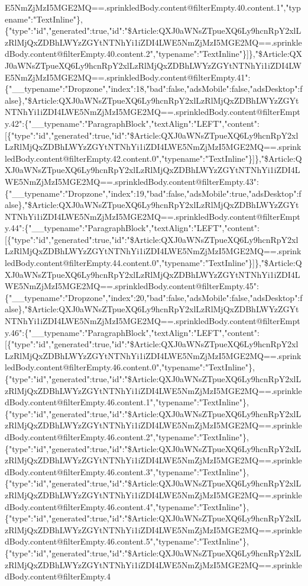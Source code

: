 E5NmZjMzI5MGE2MQ==.sprinkledBody.content@filterEmpty.40.content.1","typename":"TextInline"\},\{"type":"id","generated":true,"id":"\$Article:QXJ0aWNsZTpueXQ6Ly9hcnRpY2xlLzRlMjQxZDBhLWYzZGYtNTNhYi1iZDI4LWE5NmZjMzI5MGE2MQ==.sprinkledBody.content@filterEmpty.40.content.2","typename":"TextInline"\}{]}\},"\$Article:QXJ0aWNsZTpueXQ6Ly9hcnRpY2xlLzRlMjQxZDBhLWYzZGYtNTNhYi1iZDI4LWE5NmZjMzI5MGE2MQ==.sprinkledBody.content@filterEmpty.41":\{"\_\_typename":"Dropzone","index":18,"bad":false,"adsMobile":false,"adsDesktop":false\},"\$Article:QXJ0aWNsZTpueXQ6Ly9hcnRpY2xlLzRlMjQxZDBhLWYzZGYtNTNhYi1iZDI4LWE5NmZjMzI5MGE2MQ==.sprinkledBody.content@filterEmpty.42":\{"\_\_typename":"ParagraphBlock","textAlign":"LEFT","content":{[}\{"type":"id","generated":true,"id":"\$Article:QXJ0aWNsZTpueXQ6Ly9hcnRpY2xlLzRlMjQxZDBhLWYzZGYtNTNhYi1iZDI4LWE5NmZjMzI5MGE2MQ==.sprinkledBody.content@filterEmpty.42.content.0","typename":"TextInline"\}{]}\},"\$Article:QXJ0aWNsZTpueXQ6Ly9hcnRpY2xlLzRlMjQxZDBhLWYzZGYtNTNhYi1iZDI4LWE5NmZjMzI5MGE2MQ==.sprinkledBody.content@filterEmpty.43":\{"\_\_typename":"Dropzone","index":19,"bad":false,"adsMobile":true,"adsDesktop":false\},"\$Article:QXJ0aWNsZTpueXQ6Ly9hcnRpY2xlLzRlMjQxZDBhLWYzZGYtNTNhYi1iZDI4LWE5NmZjMzI5MGE2MQ==.sprinkledBody.content@filterEmpty.44":\{"\_\_typename":"ParagraphBlock","textAlign":"LEFT","content":{[}\{"type":"id","generated":true,"id":"\$Article:QXJ0aWNsZTpueXQ6Ly9hcnRpY2xlLzRlMjQxZDBhLWYzZGYtNTNhYi1iZDI4LWE5NmZjMzI5MGE2MQ==.sprinkledBody.content@filterEmpty.44.content.0","typename":"TextInline"\}{]}\},"\$Article:QXJ0aWNsZTpueXQ6Ly9hcnRpY2xlLzRlMjQxZDBhLWYzZGYtNTNhYi1iZDI4LWE5NmZjMzI5MGE2MQ==.sprinkledBody.content@filterEmpty.45":\{"\_\_typename":"Dropzone","index":20,"bad":false,"adsMobile":false,"adsDesktop":false\},"\$Article:QXJ0aWNsZTpueXQ6Ly9hcnRpY2xlLzRlMjQxZDBhLWYzZGYtNTNhYi1iZDI4LWE5NmZjMzI5MGE2MQ==.sprinkledBody.content@filterEmpty.46":\{"\_\_typename":"ParagraphBlock","textAlign":"LEFT","content":{[}\{"type":"id","generated":true,"id":"\$Article:QXJ0aWNsZTpueXQ6Ly9hcnRpY2xlLzRlMjQxZDBhLWYzZGYtNTNhYi1iZDI4LWE5NmZjMzI5MGE2MQ==.sprinkledBody.content@filterEmpty.46.content.0","typename":"TextInline"\},\{"type":"id","generated":true,"id":"\$Article:QXJ0aWNsZTpueXQ6Ly9hcnRpY2xlLzRlMjQxZDBhLWYzZGYtNTNhYi1iZDI4LWE5NmZjMzI5MGE2MQ==.sprinkledBody.content@filterEmpty.46.content.1","typename":"TextInline"\},\{"type":"id","generated":true,"id":"\$Article:QXJ0aWNsZTpueXQ6Ly9hcnRpY2xlLzRlMjQxZDBhLWYzZGYtNTNhYi1iZDI4LWE5NmZjMzI5MGE2MQ==.sprinkledBody.content@filterEmpty.46.content.2","typename":"TextInline"\},\{"type":"id","generated":true,"id":"\$Article:QXJ0aWNsZTpueXQ6Ly9hcnRpY2xlLzRlMjQxZDBhLWYzZGYtNTNhYi1iZDI4LWE5NmZjMzI5MGE2MQ==.sprinkledBody.content@filterEmpty.46.content.3","typename":"TextInline"\},\{"type":"id","generated":true,"id":"\$Article:QXJ0aWNsZTpueXQ6Ly9hcnRpY2xlLzRlMjQxZDBhLWYzZGYtNTNhYi1iZDI4LWE5NmZjMzI5MGE2MQ==.sprinkledBody.content@filterEmpty.46.content.4","typename":"TextInline"\},\{"type":"id","generated":true,"id":"\$Article:QXJ0aWNsZTpueXQ6Ly9hcnRpY2xlLzRlMjQxZDBhLWYzZGYtNTNhYi1iZDI4LWE5NmZjMzI5MGE2MQ==.sprinkledBody.content@filterEmpty.46.content.5","typename":"TextInline"\},\{"type":"id","generated":true,"id":"\$Article:QXJ0aWNsZTpueXQ6Ly9hcnRpY2xlLzRlMjQxZDBhLWYzZGYtNTNhYi1iZDI4LWE5NmZjMzI5MGE2MQ==.sprinkledBody.content@filterEmpty.4